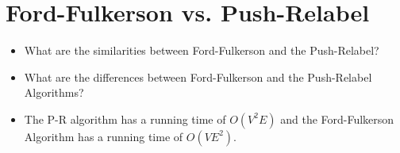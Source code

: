 \documentclass[12pt]{article}
\theoremstyle{definition}
\begin{document}
\newpage
\section{Ford-Fulkerson vs. Push-Relabel}

\begin{itemize}
	\item What are the similarities between Ford-Fulkerson and the Push-Relabel?
	
	\vfill
	\item What are the differences between Ford-Fulkerson and the Push-Relabel Algorithms?
	\vfill

	\item The P-R algorithm has a running time of $O(V^2E)$ and the Ford-Fulkerson Algorithm has a running time of $O(VE^2)$.
\end{itemize}
\end{document}

